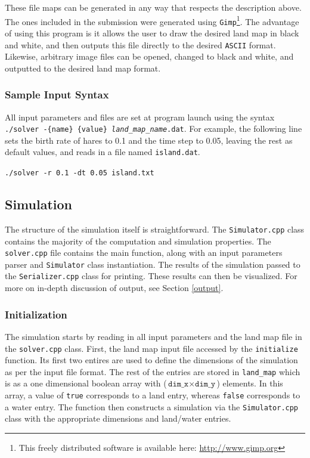 \documentclass[a4paper,11pt]{article}
\begin{document}
{These file maps can be generated in any way that respects the description above.  The ones included in the submission were generated using \texttt{Gimp}\footnote{This freely distributed software is available here: \url{http://www.gimp.org}}.  The advantage of using this program is it allows the user to draw the desired land map in black and white, and then outputs this file directly to the desired \texttt{ASCII} format.  Likewise, arbitrary image files can be opened, changed to black and white, and outputted to the desired land map format.

  

\subsubsection{Sample Input Syntax}\label{syntax}

All input parameters and files are set at program launch using the syntax \texttt{./solver -\{name\} \{value\} \emph{land\_map\_name}.dat}.  For example, the following line sets the birth rate of hares to 0.1 and the time step to 0.05, leaving the rest as default values, and reads in a file named \texttt{island.dat}.

\vspace{5pt}
\noindent\texttt{./solver -r 0.1 -dt 0.05 island.txt}

\subsection{Simulation}

The structure of the simulation itself is straightforward.  The \texttt{Simulator.cpp} class contains the majority of the computation and simulation properties.  The \texttt{solver.cpp} file contains the main function, along with an input parameters parser and \texttt{Simulator} class instantiation.  The results of the simulation passed to the \texttt{Serializer.cpp} class for printing.  These results can then be visualized.  For more on in-depth discussion of output, see Section \ref{output}.

\subsubsection{Initialization}

The simulation starts by reading in all input parameters and the land map file in the \texttt{solver.cpp} class.  First, the land map input file accessed by the \texttt{initialize} function.  Its first two entires are used to define the dimensions of the simulation as per the input file format.  The rest of the entries are stored in \texttt{land\_map} which is as a one dimensional boolean array with ($\texttt{dim\_x} \times \texttt{dim\_y}$) elements.  In this array, a value of \texttt{true} corresponds to a land entry, whereas \texttt{false} corresponds to a water entry.  The function then constructs a simulation via the \texttt{Simulator.cpp} class with the appropriate dimensions and land/water entries.  

}
\end{document}
